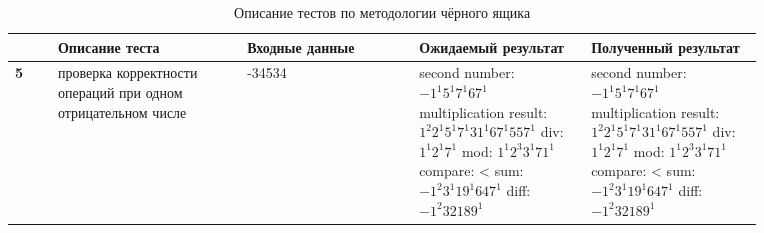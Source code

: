 \newpage
\begin{table}[htbp]
	\centering
	\caption{Описание тестов по методологии чёрного ящика}
	\begin{tabular}{|p{0.05\linewidth}|p{0.22\linewidth}|p{0.2\linewidth}|p{0.2\linewidth}|p{0.2\linewidth}|}
		\hline
		& \textbf{Описание теста} & \textbf{Входные данные} & \textbf{Ожидаемый результат} & \textbf{Полученный результат} \\
		\hline
		
		\textbf{5} 
		& проверка корректности операций при одном отрицательном числе
		& -34534 \newline -2345
		& second number: $- 1^1 5^1 7^1 67^1$ \newline
		multiplication result: $1^2 2^1 5^1 7^1 31^1 67^1 557^1$ \newline
		div: $1^1 2^1 7^1$ \newline
		mod: $1^1 2^3 3^1 71^1$ \newline
		compare: < \newline
		sum: $- 1^2 3^1 19^1 647^1$ \newline
		diff: $- 1^2 32189^1$ \newline
		&second number: $- 1^1 5^1 7^1 67^1$ \newline
		multiplication result: $1^2 2^1 5^1 7^1 31^1 67^1 557^1$ \newline
		div: $1^1 2^1 7^1$ \newline
		mod: $1^1 2^3 3^1 71^1$ \newline
		compare: < \newline
		sum: $- 1^2 3^1 19^1 647^1$ \newline
		diff: $- 1^2 32189^1$ \newline
		\\
		\hline
		

\end{tabular}
\end{table}
